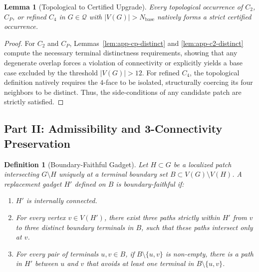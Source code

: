 \documentclass[12pt]{article}
\newtheorem{lemma}[theorem]{Lemma}
\newtheorem{definition}[theorem]{Definition}
\begin{document}
\begin{lemma}[Topological to Certified Upgrade]
\label{lem:app-certified-upgrade}
Every topological occurrence of $C_2$, $C_P$, or refined $C_4$ in $G \in \mathcal{Q}$ with $|V(G)| > N_{\mathrm{base}}$ natively forms a strict certified occurrence.
\end{lemma}
\begin{proof}
For $C_2$ and $C_P$, Lemmas~\ref{lem:app-cp-distinct} and \ref{lem:app-c2-distinct} compute the necessary terminal distinctness requirements, showing that any degenerate overlap forces a violation of connectivity or explicitly yields a base case excluded by the threshold $|V(G)| > 12$. For refined $C_4$, the topological definition natively requires the $4$-face to be isolated, structurally coercing its four neighbors to be distinct. Thus, the side-conditions of any candidate patch are strictly satisfied.
\end{proof}

\subsection*{Part II: Admissibility and 3-Connectivity Preservation}

\begin{definition}[Boundary-Faithful Gadget]
\label{def:app-boundary-faithful}
Let $H \subset G$ be a localized patch intersecting $G \setminus H$ uniquely at a terminal boundary set $B \subset V(G) \setminus V(H)$. A replacement gadget $H'$ defined on $B$ is \emph{boundary-faithful} if:
\begin{enumerate}
    \item $H'$ is internally connected.
    \item For every vertex $v \in V(H')$, there exist three paths strictly within $H'$ from $v$ to three distinct boundary terminals in $B$, such that these paths intersect only at $v$.
    \item For every pair of terminals $u, v \in B$, if $B \setminus \{u, v\}$ is non-empty, there is a path in $H'$ between $u$ and $v$ that avoids at least one terminal in $B \setminus \{u, v\}$.
\end{enumerate}
\end{definition}
\end{document}
